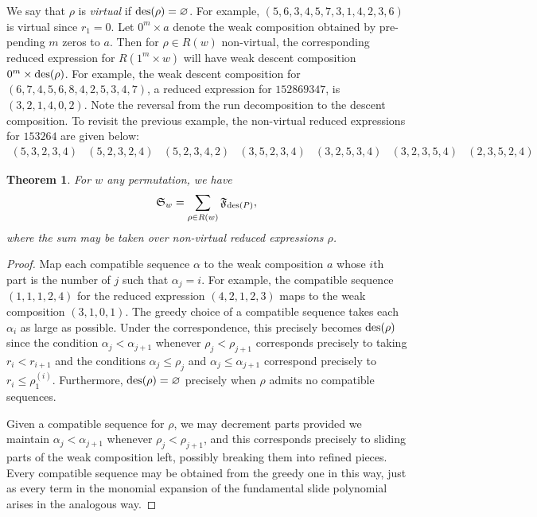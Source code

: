\documentclass[11pt]{amsart}
\newtheorem{theorem}{Theorem}[section]
\theoremstyle{definition}
\theoremstyle{remark}
\numberwithin{equation}{section}
\newcommand{\des}{\ensuremath\mathrm{des}}
\newcommand{\R}{\ensuremath{R}}
\newcommand{\schubert}{\ensuremath\mathfrak{S}}
\newcommand{\fund}{\ensuremath\mathfrak{F}}
\begin{document}
We say that $\rho$ is \emph{virtual} if $\des(\rho) = \varnothing$. For example, $(5,6,3,4,5,7,3,1,4,2,3,6)$ is virtual since $r_1=0$. Let $0^m \times a$ denote the weak composition obtained by pre-pending $m$ zeros to $a$. Then for $\rho \in R(w)$ non-virtual, the corresponding reduced expression for $R(1^m \times w)$ will have weak descent composition $0^m \times \des(\rho)$. For example, the weak descent composition for $(6,7,4,5,6,8,4,2,5,3,4,7)$, a reduced expression for $152869347$, is $(3,2,1,4,0,2)$. Note the reversal from the run decomposition to the descent composition. To revisit the previous example, the non-virtual reduced expressions for $153264$ are given below:
\begin{displaymath}
  \begin{array}{ccccccc}
    (5,3,2,3,4) & (5,2,3,2,4) & (5,2,3,4,2) & (3,5,2,3,4) & (3,2,5,3,4) & (3,2,3,5,4) & (2,3,5,2,4) 
  \end{array}
\end{displaymath}


\begin{theorem}
  For $w$ any permutation, we have
  \begin{equation}
    \schubert_{w} = \sum_{\rho \in \R(w)} \fund_{\des(P)},
    \label{e:schubert-slide}
  \end{equation}
  where the sum may be taken over non-virtual reduced expressions $\rho$.
  \label{thm:schubert-slide}
\end{theorem}

\begin{proof}
  Map each compatible sequence $\alpha$ to the weak composition $a$ whose $i$th part is the number of $j$ such that $\alpha_j = i$. For example, the compatible sequence $(1,1,1,2,4)$ for the reduced expression $(4,2,1,2,3)$ maps to the weak composition $(3,1,0,1)$. The greedy choice of a compatible sequence takes each $\alpha_i$ as large as possible. Under the correspondence, this precisely becomes $\des(\rho)$ since the condition $\alpha_j < \alpha_{j+1}$ whenever $\rho_j < \rho_{j+1}$ corresponds precisely to taking $r_i < r_{i+1}$ and the conditions $\alpha_j \leq \rho_j$ and $\alpha_j \leq \alpha_{j+1}$ correspond precisely to $r_i \leq \rho_1^{(i)}$. Furthermore, $\des(\rho) = \varnothing$ precisely when $\rho$ admits no compatible sequences.

  Given a compatible sequence for $\rho$, we may decrement parts provided we maintain $\alpha_j < \alpha_{j+1}$ whenever $\rho_j < \rho_{j+1}$, and this corresponds precisely to sliding parts of the weak composition left, possibly breaking them into refined pieces. Every compatible sequence may be obtained from the greedy one in this way, just as every term in the monomial expansion of the fundamental slide polynomial arises in the analogous way. 
\end{proof}
\end{document}
